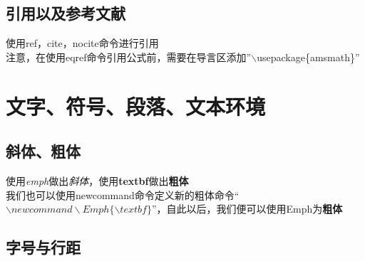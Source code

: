\documentclass[UTF8]{ctexbook}
\begin{document}
\section{引用以及参考文献}
使用ref，cite，nocite命令进行引用
\\
注意，在使用eqref命令引用公式前，需要在导言区添加''$\backslash$usepackage\{amsmath\}''

\chapter{文字、符号、段落、文本环境}
\section{斜体、粗体}

使用\emph{emph}做出\emph{斜体}，使用\textbf{textbf}做出\textbf{粗体}\\
\newcommand\Emph{\textbf}
我们也可以使用newcommand命令定义新的粗体命令“$\backslash newcommand\backslash Emph\{\backslash textbf\}$”，自此以后，我们便可以使用Emph为\Emph{粗体}\\

\section{字号与行距}
\end{document}
